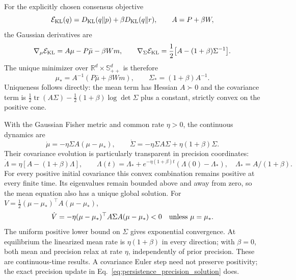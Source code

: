 For the explicitly chosen consensus objective
\begin{equation}
 \mathcal E_{\rm KL}(q)=D_{\rm KL}(q\|p)+\beta D_{\rm KL}(q\|r),
 \qquad A=P+\beta W,
 \label{eq:persistence_KL_objective}
\end{equation}
the Gaussian derivatives are
\begin{equation}
 \nabla_\mu \mathcal E_{\rm KL}=A\mu-P\bar\mu-\beta Wm,
 \qquad
 \nabla_\Sigma \mathcal E_{\rm KL}
 =\frac12\big[A-(1+\beta)\Sigma^{-1}\big].
 \label{eq:rock_grad_mu}
\end{equation}
The unique minimizer over $\mathbb R^d\times\mathbb S_{++}^d$ is therefore
\begin{equation}
 \mu_* = A^{-1}(P\bar\mu+\beta Wm),\qquad
 \Sigma_*=(1+\beta)A^{-1}.
 \label{eq:persistence_stationary}
\end{equation}
Uniqueness follows directly: the mean term has Hessian $A\succ0$ and the covariance term is $\tfrac12\operatorname{tr}(A\Sigma)-\tfrac12(1+\beta)\log\det\Sigma$ plus a constant, strictly convex on the positive cone.

With the Gaussian Fisher metric and common rate $\eta>0$, the continuous dynamics are
\begin{equation}
 \dot\mu=-\eta\Sigma A(\mu-\mu_*),\qquad
 \dot\Sigma=-\eta\Sigma A\Sigma+\eta(1+\beta)\Sigma.
 \label{eq:rock_natural_grad_step}
\end{equation}
Their covariance evolution is particularly transparent in precision coordinates:
\begin{equation}
 \dot\Lambda=\eta[A-(1+\beta)\Lambda],\qquad
 \Lambda(t)=\Lambda_*+e^{-\eta(1+\beta)t}(\Lambda(0)-\Lambda_*),
 \quad \Lambda_*=A/(1+\beta).
 \label{eq:persistence_precision_solution}
\end{equation}
For every positive initial covariance this convex combination remains positive at every finite time. Its eigenvalues remain bounded above and away from zero, so the mean equation also has a unique global solution. For $V=\tfrac12(\mu-\mu_*)^\top A(\mu-\mu_*)$,
\begin{equation}
 \dot V=-\eta(\mu-\mu_*)^\top A\Sigma A(\mu-\mu_*)<0
 \quad\hbox{unless }\mu=\mu_*.
\end{equation}
The uniform positive lower bound on $\Sigma$ gives exponential convergence. At equilibrium the linearized mean rate is $\eta(1+\beta)$ in every direction; with $\beta=0$, both mean and precision relax at rate $\eta$, independently of prior precision. These are continuous-time results. A covariance Euler step need not preserve positivity; the exact precision update in Eq.~\eqref{eq:persistence_precision_solution} does.

